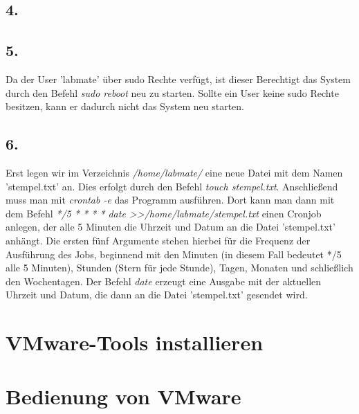 \documentclass[
    fontsize=12pt,
    headings=small,
    parskip=half,           %
    bibliography=totoc,
    numbers=noenddot,       %
    open=any,               %
    ]{scrreprt}
\begin{document}
\subsection*{4.}


\subsection*{5.}
Da der User 'labmate' über sudo Rechte verfügt, ist dieser Berechtigt das System durch den Befehl \emph{sudo reboot} neu zu starten. Sollte ein User keine sudo Rechte besitzen, kann er dadurch nicht das System neu starten.

\subsection*{6.}
Erst legen wir im Verzeichnis \emph{/home/labmate/} eine neue Datei mit dem Namen 'stempel.txt' an. Dies erfolgt durch den Befehl \emph{touch stempel.txt}. Anschließend muss man mit \emph{crontab -e} das Programm ausführen. Dort kann man dann mit dem Befehl \emph{*/5 * * * * date \textgreater\textgreater /home/labmate/stempel.txt} einen Cronjob anlegen, der alle 5 Minuten die Uhrzeit und Datum an die Datei 'stempel.txt' anhängt. Die ersten fünf Argumente stehen hierbei für die Frequenz der Ausführung des Jobs, beginnend mit den Minuten (in diesem Fall bedeutet */5 alle 5 Minuten), Stunden (Stern für jede Stunde), Tagen, Monaten und schließlich den Wochentagen. Der Befehl \emph{date} erzeugt eine Ausgabe mit der aktuellen Uhrzeit und Datum, die dann an die Datei 'stempel.txt' gesendet wird.



\section{VMware-Tools installieren}

\section{Bedienung von VMware}




\end{document}
